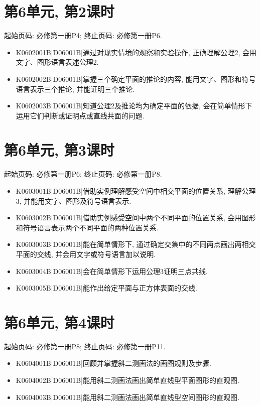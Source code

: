 \section*{第6单元, 第2课时}
起始页码: 必修第一册P4; 终止页码: 必修第一册P6.
\begin{itemize}
\item K0602001B|D06001B|通过对现实情境的观察和实验操作, 正确理解公理2, 会用文字、图形语言表述公理2.
\item K0602002B|D06001B|掌握三个确定平面的推论的内容, 能用文字、图形和符号语言表示三个推论, 并能证明三个推论.
\item K0602003B|D06001B|知道公理2及推论均为确定平面的依据, 会在简单情形下运用它们判断或证明点或直线共面的问题.
\end{itemize}

\section*{第6单元, 第3课时}
起始页码: 必修第一册P6; 终止页码: 必修第一册P8.
\begin{itemize}
\item K0603001B|D06001B|借助实例理解感受空间中相交平面的位置关系, 理解公理3, 并能用文字、图形及符号语言表示.
\item K0603002B|D06001B|借助实例感受空间中两个不同平面的位置关系, 会用图形和符号语言表示两个不同平面的两种位置关系.
\item K0603003B|D06001B|能在简单情形下, 通过确定交集中的不同两点画出两相交平面的交线, 并会用文字或符号语言加以说明.
\item K0603004B|D06001B|会在简单情形下运用公理3证明三点共线.
\item K0603005B|D06001B|能作出给定平面与正方体表面的交线.
\end{itemize}

\section*{第6单元, 第4课时}
起始页码: 必修第一册P8; 终止页码: 必修第一册P11.
\begin{itemize}
\item K0604001B|D06001B|回顾并掌握斜二测画法的画图规则及步骤.
\item K0604002B|D06001B|能用斜二测画法画出简单直线型平面图形的直观图.
\item K0604003B|D06001B|能用斜二测画法画出简单直线型空间图形的直观图.
\end{itemize}

